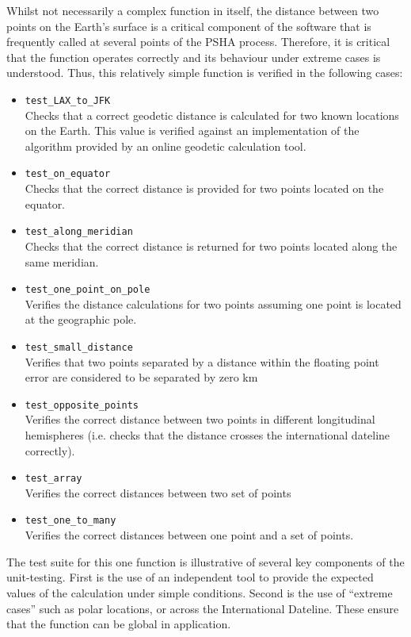 Whilst not necessarily a complex function in itself, the distance 
between two points on the Earth's surface is a critical component 
of the software that is frequently called at several points of the
PSHA process. Therefore, it is critical that the function operates 
correctly and its behaviour under extreme cases is understood. 
Thus, this relatively simple function is verified in the following cases:
\begin{itemize}
\item \verb=test_LAX_to_JFK= \hfill \\
    Checks that a correct geodetic distance is calculated for two known
    locations on the Earth. This value is verified against an implementation of
    the algorithm provided by an online geodetic calculation tool.
\item \verb=test_on_equator= \hfill \\
    Checks that the correct distance is provided for two points located on the
    equator.
\item \verb=test_along_meridian= \hfill \\
    Checks that the correct distance is returned for two points located along
    the same meridian.
\item \verb=test_one_point_on_pole= \hfill \\
    Verifies the distance calculations for two points assuming one point is
    located at the geographic pole.
\item \verb=test_small_distance= \hfill \\
    Verifies that two points separated by a distance within the floating point
    error are considered to be separated by zero km
\item \verb=test_opposite_points= \hfill \\
    Verifies the correct distance between two points in different longitudinal
    hemispheres (i.e. checks that the distance crosses the international
    dateline correctly).
\item \verb=test_array= \hfill \\
    Verifies the correct distances between two set of points
\item \verb=test_one_to_many= \hfill \\
    Verifies the correct distances between one point and a set of points.
\end{itemize}
%
The test suite for this one function is illustrative of several key components
of the unit-testing. First is the use of an independent tool to provide the
expected values of the calculation under simple conditions. Second is the use of
``extreme cases'' such as polar locations, or across the International Dateline.
These ensure that the function can be global in application. 

